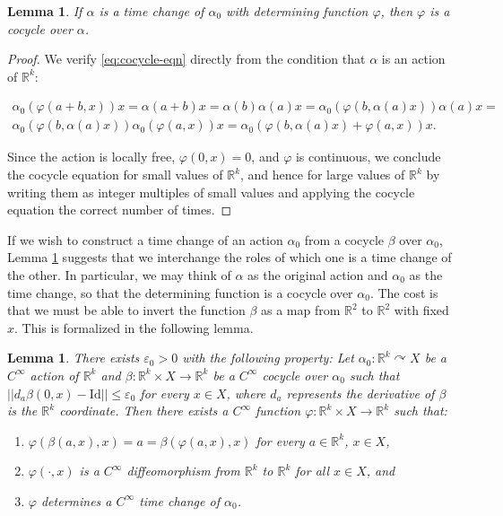 \documentclass[12pt]{amsart}
\newtheorem{lemma}[theorem]{Lemma}
\theoremstyle{definition}
\theoremstyle{remark}
\numberwithin{equation}{section}
\newcommand{\id}{\mathrm{Id}}
\newcommand{\R}{\mathbb{R}}
\newcommand{\norm}[1]{{\left|\left| #1 \right|\right|}}
\newcommand{\ve}{\varepsilon}
\newtheorem{Structural Stability Theorem}[theorem]{Structural Stability Theorem}
\begin{document}
\begin{lemma}
\label{lem:time-change-cocycle}
If $\alpha$ is a time change of $\alpha_0$ with determining function $\varphi$, then $\varphi$ is a cocycle over $\alpha$.
\end{lemma}

\begin{proof}
We verify \eqref{eq:cocycle-eqn} directly from the condition that $\alpha$ is an action of $\R^k$:

\begin{multline*} \alpha_0(\varphi(a+b,x))x = \alpha(a+b)x = \alpha(b)\alpha(a)x = \alpha_0(\varphi(b,\alpha(a)x))\alpha(a)x =  \\ \alpha_0(\varphi(b,\alpha(a)x))\alpha_0(\varphi(a,x))x = \alpha_0(\varphi(b,\alpha(a)x) + \varphi(a,x))x.
\end{multline*}

Since the action is locally free, {  $\varphi(0,x) = 0$, and $\varphi$ is continuous}, we conclude the cocycle equation for small values of $\R^k$, and hence for large values of $\R^k$ by writing them as integer multiples of small values and applying the cocycle equation the correct number of times.
\end{proof}

If we wish to construct a time change of an action $\alpha_0$ from a cocycle $\beta$ over $\alpha_0$, Lemma \ref{lem:time-change-cocycle} suggests that we interchange the roles of which one is a time change of the other. In particular, we may think of $\alpha$ as the original action and $\alpha_0$ as the time change, so that the determining function is a cocycle over $\alpha_0$. The cost is that we must be able to invert the function $\beta$ as a map from $\R^2$ to $\R^2$ with fixed $x$. This is formalized in the following lemma.

\begin{lemma}
\label{lem:build-time-change}
There exists $\ve_0 > 0$ with the following property: Let $\alpha_0 : \R^k \curvearrowright X$ be a $C^\infty$ action of $\R^k$ and $\beta : \R^k \times X \to \R^k$ be a $C^\infty$ cocycle over $\alpha_0$ such that $\norm{d_a\beta(0,x) - \id} \le \ve_0$ for every $x \in X$, where $d_a$ represents the derivative of $\beta$ is the $\R^k$ coordinate. Then there exists a $C^\infty$ function $\varphi : \R^k \times X \to { \R^k}$ such that:

\begin{enumerate}
\item $\varphi(\beta(a,x),x) = a = \beta(\varphi(a,x),x)$ for every $a \in \R^k$, $x \in X$,
\item $\varphi(\cdot, x)$ is a $C^\infty$ diffeomorphism from $\R^k$ to $\R^k$ {  for all $x \in X$}, and
\item $\varphi$ determines a $C^\infty$ time change of $\alpha_0$.
\end{enumerate}
\end{lemma}
\end{document}

